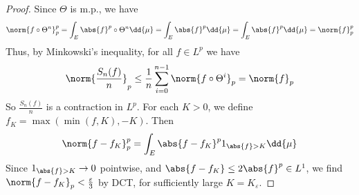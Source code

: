 \begin{proof}
	Since $\Theta$ is m.p., we have
	\begin{align*}
        \norm{f \circ \Theta^n}_p^p = \int_E \abs{f}^p \circ \Theta^n \dd{\mu} = \int_E \abs{f}^p \dd{\mu} = \int_E \abs{f}^p \dd{\mu} = \norm{f}_p^p
    \end{align*}
	Thus, by Minkowski's inequality, for all $f \in L^p$ we have
	\begin{align*}
        \norm{\frac{S_n(f)}{n}}_p \leq \frac{1}{n} \sum_{i=0}^{n-1} \norm{f \circ \Theta^i}_p = \norm{f}_p
    \end{align*}
	So $\frac{S_n(f)}{n}$ is a contraction in $L^p$.
	For each $K > 0$, we define $f_K = \max(\min(f, K), -K)$.
	Then
	\begin{align*}
        \norm{f - f_K}_p^p = \int_E \abs{f - f_K}^p 1_{\abs{f} > K} \dd{\mu}
    \end{align*}
	Since $1_{\abs{f} > K} \to 0$ pointwise, and $\abs{f - f_K} \leq 2\abs{f}^p \in L^1$, we find $\norm{f - f_K}_p < \frac{\varepsilon}{3}$ by DCT, for sufficiently large $K = K_\varepsilon$.


\end{proof}
